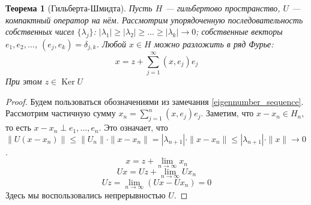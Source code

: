 \documentclass[11pt,openany,a4paper]{scrartcl}
\theoremstyle{plain}
\newtheorem{theorem}{Теорема}[section]
\theoremstyle{definition}
\DeclareMathOperator{\Ker}{Ker}
\begin{document}
\begin{theorem}[Гильберта-Шмидта]
    Пусть $H$ — гильбертово пространство, $U$ — компактный оператор на нём. Рассмотрим 
    упорядоченную последовательность собственных чисел $\{\lambda_j\}$:
    $|\lambda_1| \geqslant |\lambda_2| \geqslant \ldots \geqslant |\lambda_k| \to 0$;
    собственные векторы
    $e_1, e_2, \ldots$, $(e_j, e_k) = \delta_{j,k}$. Любой $x\in H$ можно
    разложить в ряд Фурье:
    $$
    x = z + \sum\limits_{j=1}^\infty (x, e_j)e_j
    $$
    При этом $z \in \Ker U$
\end{theorem}
\begin{proof}
    Будем пользоваться обозначениями из замечания \ref{eigennumber_sequence}.
    Рассмотрим частичную сумму $x_n = \sum\limits_{j=1}^n (x, e_j)e_j$. Заметим, что
    $x - x_n \in H_n$, то есть $x - x_n \perp e_1, \ldots, e_n$. Это означает, что
    $\|U(x - x_n)\| \leqslant \|U_n\| \cdot \|x - x_n\| = |\lambda_{n+1}| \cdot \|x - x_n\|
    \leqslant |\lambda_{n+1}|\cdot \|x\| \to 0$.
    $$
    x = z + \lim\limits_{n \to \infty} x_n
    $$
    $$
    Ux = Uz + \lim\limits_{n \to \infty} Ux_n
    $$
    $$
    Uz = \lim\limits_{n \to \infty} (Ux - Ux_n) = 0
    $$
    Здесь мы воспользовались непрерывностью $U$.
\end{proof}
\end{document}
